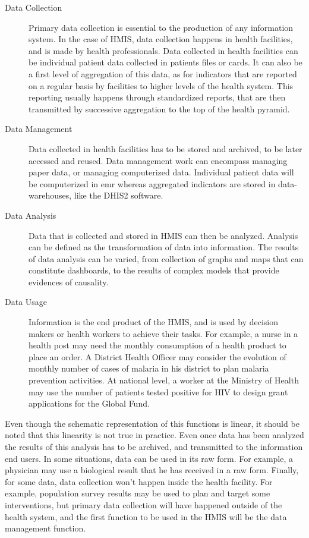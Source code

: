 \begin{description}
	\item[Data Collection] Primary data collection is essential to the production of any information system. In the case of HMIS, data collection happens in health facilities, and is made by health professionals. Data collected in health facilities can be individual patient data collected in patients files or cards. It can also be a first level of aggregation of this data, as for indicators that are reported on a regular basis by facilities to higher levels of the health system. This reporting usually happens through standardized reports, that are then transmitted by successive aggregation to the top of the health pyramid.

	\item[Data Management] Data collected in health facilities has to be stored and archived, to be later accessed and reused. Data management work can encompass managing paper data, or managing computerized data. Individual patient data will be computerized in \gls*{emr} whereas aggregated indicators are stored in data-warehouses, like the DHIS2 software.

	\item[Data Analysis] Data that is collected and stored in HMIS can then be analyzed. Analysis can be defined as the transformation of data into information. The results of data analysis can be varied, from collection of graphs and maps that can constitute dashboards, to the results of complex models that provide evidences of causality.

	\item[Data Usage] Information is the end product of the HMIS, and is used by decision makers or health workers to achieve their tasks. For example, a nurse in a health post may need the monthly consumption of a health product to place an order. A District Health Officer may consider the evolution of monthly number of cases of malaria in his district to plan malaria prevention activities. At national level, a worker at the Ministry of Health may use the number of patients tested positive for HIV to design grant applications for the Global Fund.
\end{description}

Even though the schematic representation of this functions is linear, it should be noted that this linearity is not true in practice. Even once data has been analyzed the results of this analysis has to be archived, and transmitted to the information end users. In some situations, data can be used in its raw form. For example, a physician may use a biological result that he has received in a raw form. Finally, for some data, data collection won't happen inside the health  facility. For example, population survey results may be used to plan and target some interventions, but primary data collection will have happened outside of the health system, and the first function to be used in the HMIS will be the data management function.

